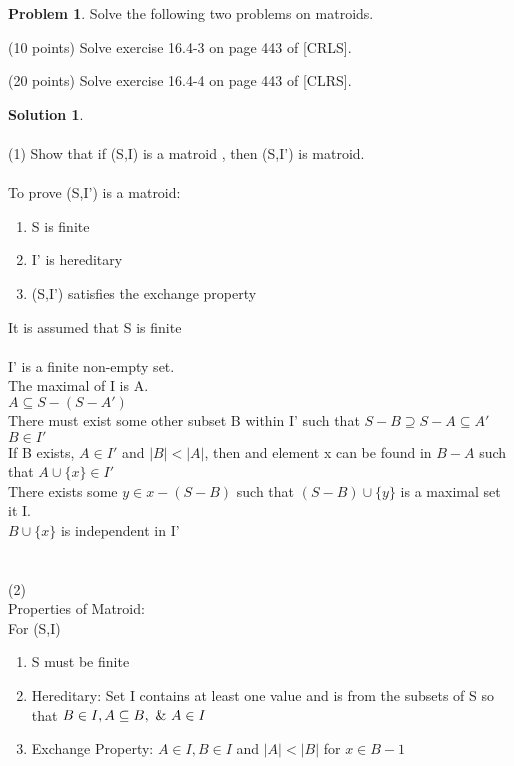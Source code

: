 \documentclass{article}
\theoremstyle{definition}
\newtheorem{problem}{Problem}
\newtheorem*{solution}{Solution}
\begin{document}
\begin{problem} Solve the following two problems on matroids.
\begin{compactenum}
\item (10 points) Solve exercise 16.4-3 on page 443 of [CRLS]. 
\item (20 points)
Solve exercise 16.4-4 on page 443 of [CLRS]. 
\end{compactenum}
\end{problem}
\begin{solution} \\
\\
(1) Show that if (S,I) is a matroid , then (S,I') is matroid.\\
\\
To prove (S,I') is a matroid:
\begin{enumerate}
    \item S is finite
    \item I' is hereditary
    \item (S,I') satisfies the exchange property
\end{enumerate}
It is assumed that S is finite\\
\\
I' is a finite non-empty set.\\
The maximal of I is A.\\
$A \subseteq S - (S-A')$\\
There must exist some other subset B within I' such that $S-B \supseteq S-A \subseteq A'$\\
$B \in I'$\\
If B exists, $A \in I'$ and $|B| < |A|$, then and element x can be found in $B-A$ such that $A \cup \{x\} \in I'$\\
There exists some $y \in x - (S-B)$ such that $(S-B)\cup \{y\} $ is a maximal set it I.\\
$B\cup \{x\}$ is independent in I'\\
\\
\\
(2)\\
Properties of Matroid:\\
For (S,I)\\
\begin{enumerate}
    \item S must be finite
    \item Hereditary: Set I contains at least one value and is from the subsets of S so that $B \in I, \\  A\subseteq B ,\  \& \ A \in I$
    \item Exchange Property: $A \in I, B \in I $ and $|A|<|B|$ for $x \in B-1$\\

\end{enumerate}
\end{solution}
\end{document}
